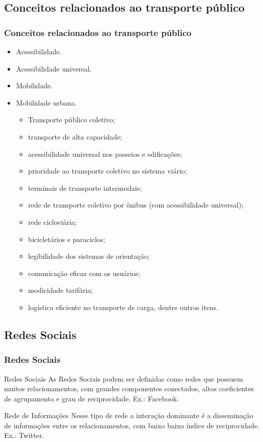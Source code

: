 \documentclass{beamer}
\begin{document}
\subsection{Conceitos relacionados ao transporte público}
\begin{frame}
\frametitle{Conceitos relacionados ao transporte público}
\begin{itemize}
\item Acessibilidade.
\item Acessibilidade universal.
\item Mobilidade.
\item Mobilidade urbana.
\begin{itemize}
\item Transporte público coletivo;
\item  transporte de alta capacidade;
\item  acessibilidade universal nos passeios e edificações;
\item prioridade ao transporte coletivo no sistema viário;
\item terminais de transporte intermodais;
\item rede de transporte coletivo por ônibus (com acessibilidade universal);
\item rede cicloviária;
\item bicicletários e paraciclos;
\item  legibilidade dos sistemas de orientação;
\item comunicação eficaz com os usuários;
\item modicidade tarifária;
\item  logística eficiente no transporte de carga, dentre outros itens.
\end{itemize} 
\end{itemize}
\end{frame}
\subsection{Redes Sociais}
\begin{frame}
\frametitle{Redes Sociais}
\begin{block}{Redes Sociais}
As Redes Sociais podem ser definidas como redes que possuem muitos relacionamentos, com grandes componentes conectados, altos coeficientes de agrupamento e grau de reciprocidade. Ex.: Facebook.
\end{block}
\begin{block}{Rede de Informações}
Nesse tipo de rede a interação dominante é a disseminação de informações entre os relacionamentos, com baixo baixo índice de reciprocidade. Ex.: Twitter.
\end{block}
\end{frame}
\end{document}
